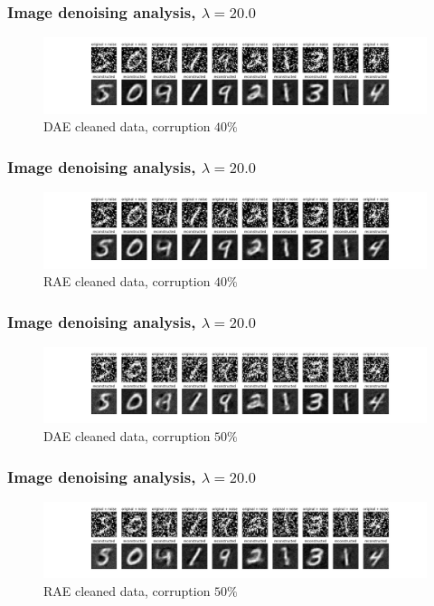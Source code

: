\documentclass{beamer}
\theoremstyle{plain}
\theoremstyle{definition}
\theoremstyle{remark}
\begin{document}
\begin{frame}
	\frametitle{Image denoising analysis, $\lambda=20.0$}
	\begin{figure}
		\centering
		\includegraphics[width=0.95\linewidth]{Images/lam20.0corr0.4/DAE_recon.png}
		\caption[]{DAE cleaned data, corruption $40\%$}
	\end{figure}
\end{frame}

\begin{frame}
	\frametitle{Image denoising analysis, $\lambda=20.0$}
	\begin{figure}
		\centering
		\includegraphics[width=0.95\linewidth]{Images/lam20.0corr0.4/RAE_recon.png}
		\caption[]{RAE cleaned data, corruption $40\%$}
	\end{figure}
\end{frame}

\begin{frame}
	\frametitle{Image denoising analysis, $\lambda=20.0$}
	\begin{figure}
		\centering
		\includegraphics[width=0.95\linewidth]{Images/lam20.0corr0.5/DAE_recon.png}
		\caption[]{DAE cleaned data, corruption $50\%$}
	\end{figure}
\end{frame}

\begin{frame}
	\frametitle{Image denoising analysis, $\lambda=20.0$}
	\begin{figure}
		\centering
		\includegraphics[width=0.95\linewidth]{Images/lam20.0corr0.5/RAE_recon.png}
		\caption[]{RAE cleaned data, corruption $50\%$}
	\end{figure}
\end{frame}
\end{document}
